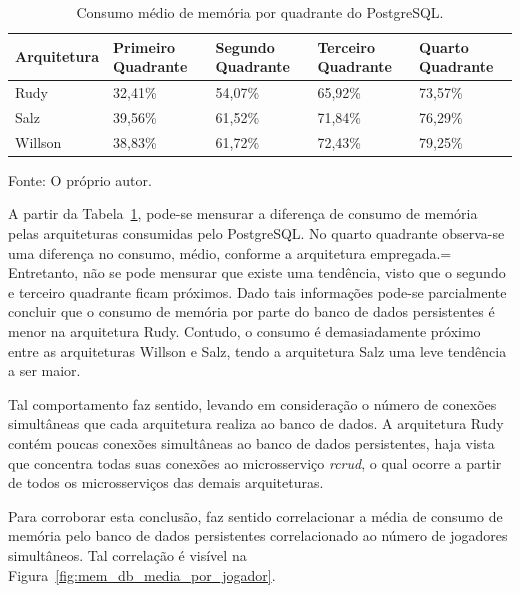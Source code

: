 \begin{table}[htb!]
\centering
\begin{adjustbox}{max width=\textwidth}
\caption{Consumo médio de memória por quadrante do PostgreSQL.}
\label{tab:mem_db_media_quadrantes}

\begin{tabular}{l|l|l|l|l}
\hline \hline
Arquitetura & Primeiro Quadrante & Segundo Quadrante & Terceiro Quadrante & Quarto Quadrante \\ \hline \hline
Rudy        & 32,41\%            & 54,07\%           & 65,92\%            & 73,57\%          \\ \hline
Salz        & 39,56\%            & 61,52\%           & 71,84\%            & 76,29\%          \\ \hline
Willson     & 38,83\%            & 61,72\%           & 72,43\%            & 79,25\%          \\ \hline \hline
\end{tabular}
\end{adjustbox}

Fonte: O próprio autor.
\end{table}

A partir da Tabela~\ref{tab:mem_db_media_quadrantes}, pode-se mensurar a diferença de consumo de memória pelas arquiteturas consumidas pelo PostgreSQL.
%
No quarto quadrante observa-se uma diferença no consumo, médio, conforme a arquitetura empregada.=
%
Entretanto, não se pode mensurar que existe uma tendência, visto que o segundo e terceiro quadrante ficam próximos.
%
Dado tais informações pode-se parcialmente concluir que o consumo de memória por parte do banco de dados persistentes é menor na arquitetura Rudy.
%
Contudo, o consumo é demasiadamente próximo entre as arquiteturas Willson e Salz, tendo a arquitetura Salz uma leve tendência a ser maior.

Tal comportamento faz sentido, levando em consideração o número de conexões simultâneas que cada arquitetura realiza ao banco de dados.
%
A arquitetura Rudy contém poucas conexões simultâneas ao banco de dados persistentes, haja vista que concentra todas suas conexões ao microsserviço \textit{rcrud}, o qual ocorre a partir de todos os microsserviços das demais arquiteturas.

Para corroborar esta conclusão, faz sentido correlacionar a média de consumo de memória pelo banco de dados persistentes correlacionado ao número de jogadores simultâneos.
%
Tal correlação é visível na Figura~\ref{fig:mem_db_media_por_jogador}.

